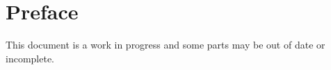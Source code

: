 \section{Preface}

This document is a work in progress and some parts may be out of date or incomplete.
\setcounter{page}{1}